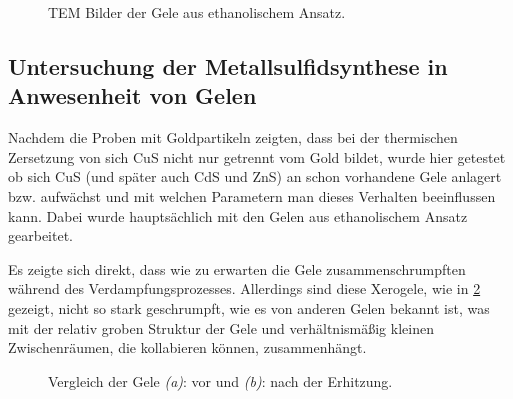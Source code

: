 		\begin{figure}[H]
			\centering
			\caption{TEM Bilder der Gele aus ethanolischem Ansatz.}
			\label{fig:Gel-E}
		\end{figure}
	
	\subsection{Untersuchung der Metallsulfidsynthese in Anwesenheit von Gelen}
	
	Nachdem die Proben mit Goldpartikeln zeigten, dass bei der thermischen Zersetzung von  sich CuS nicht nur getrennt vom Gold bildet, wurde hier getestet ob sich CuS (und später auch CdS und ZnS) an schon vorhandene Gele anlagert bzw. aufwächst und mit welchen Parametern man dieses Verhalten beeinflussen kann.
	Dabei wurde hauptsächlich mit den Gelen aus ethanolischem Ansatz gearbeitet.
	
	Es zeigte sich direkt, dass wie zu erwarten die Gele zusammenschrumpften während des Verdampfungsprozesses.
	Allerdings sind diese Xerogele, wie in \cref{fig:vn} gezeigt, nicht so stark geschrumpft, wie es von anderen Gelen bekannt ist, was mit der relativ groben Struktur der Gele und verhältnismäßig kleinen Zwischenräumen, die kollabieren können, zusammenhängt.
	
	
	\begin{figure}[H]
	\centering
	\caption{Vergleich der Gele \emph{(a)}: vor und \emph{(b)}: nach der Erhitzung.}
	\label{fig:vn}
	\end{figure} 


